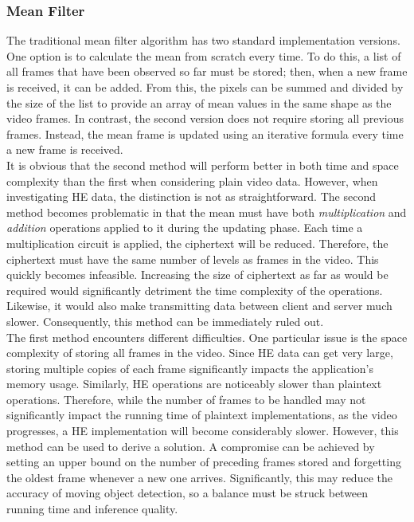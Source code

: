 \subsubsection{Mean Filter}
\setlength{\leftskip}{0.5cm}
\indent \indent
The traditional mean filter algorithm has two standard implementation versions. One option is to calculate the mean from scratch every time. To do this, a list of all frames that have been observed so far must be stored; then, when a new frame is received, it can be added. From this, the pixels can be summed and divided by the size of the list to provide an array of mean values in the same shape as the video frames. In contrast, the second version does not require storing all previous frames. Instead, the mean frame is updated using an iterative formula every time a new frame is received.\smallskip \\ \indent
It is obvious that the second method will perform better in both time and space complexity than the first when considering plain video data. However, when investigating HE data, the distinction is not as straightforward. The second method becomes problematic in that the mean must have both \textit{multiplication} and \textit{addition} operations applied to it during the updating phase. Each time a multiplication circuit is applied, the ciphertext will be reduced. Therefore, the ciphertext must have the same number of levels as frames in the video. This quickly becomes infeasible. Increasing the size of ciphertext as far as would be required would significantly detriment the time complexity of the operations. Likewise, it would also make transmitting data between client and server much slower. Consequently, this method can be immediately ruled out.
\smallskip \\ \indent
The first method encounters different difficulties. One particular issue is the space complexity of storing all frames in the video. Since HE data can get very large, storing multiple copies of each frame significantly impacts the application's memory usage. Similarly, HE operations are noticeably slower than plaintext operations. Therefore, while the number of frames to be handled may not significantly impact the running time of plaintext implementations, as the video progresses, a HE implementation will become considerably slower. However, this method can be used to derive a solution. A compromise can be achieved by setting an upper bound on the number of preceding frames stored and forgetting the oldest frame whenever a new one arrives. Significantly, this may reduce the accuracy of moving object detection, so a balance must be struck between running time and inference quality.

